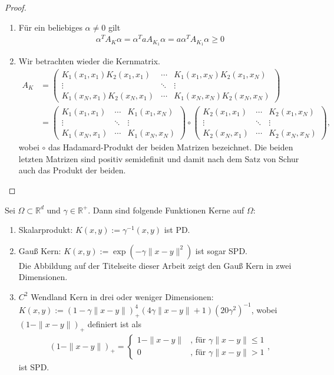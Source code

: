 \begin{proof}
\begin{enumerate}
\item
Für ein beliebiges $\alpha \neq 0$ gilt
\begin{align*}
\alpha^T A_K \alpha = \alpha^T a A_{K_1} \alpha = a \alpha^T A_{K_1} \alpha \geq 0
\end{align*}
\item
Wir betrachten wieder die Kernmatrix.
\begin{align*}
A_K &= 
\begin{pmatrix}
K_1(x_1,x_1)K_2(x_1, x_1) & \cdots & K_1(x_1,x_N)K_2(x_1, x_N) \\ 
\vdots & \ddots & \vdots \\ 
K_1(x_N,x_1)K_2(x_N, x_1) & \cdots & K_1(x_N,x_N)K_2(x_N, x_N)
\end{pmatrix} \\
&= 
\begin{pmatrix}
K_1(x_1,x_1) & \cdots & K_1(x_1,x_N) \\ 
\vdots & \ddots & \vdots \\ 
K_1(x_N,x_1) & \cdots & K_1(x_N,x_N)
\end{pmatrix}
\circ
\begin{pmatrix}
K_2(x_1, x_1) & \cdots & K_2(x_1, x_N) \\ 
\vdots & \ddots & \vdots \\ 
K_2(x_N, x_1) & \cdots & K_2(x_N, x_N)
\end{pmatrix},
\end{align*}
wobei $\circ$ das Hadamard-Produkt der beiden Matrizen bezeichnet. 
Die beiden letzten Matrizen sind positiv semidefinit und damit nach dem Satz von Schur \cite[Theorem 7.5.3]{Horn.2013} auch das Produkt der beiden.
\end{enumerate}
\end{proof}

\begin{example}
\label{ex:Kern}
Sei $\Omega \subset \mathbb{R}^d$ und $\gamma \in \mathbb{R}^+$. Dann sind folgende Funktionen Kerne auf $\Omega$:
\begin{enumerate}
\item Skalarprodukt: $K(x,y) := \gamma^{-1} (x,y)$ ist \ac{PD}.
\item Gauß Kern: $K(x,y) := \exp\left(-\gamma \|x-y\|^2\right)$ ist sogar \ac{SPD}.\\
Die Abbildung auf der Titelseite dieser Arbeit zeigt den Gauß Kern in zwei Dimensionen.
\item $C^2$ Wendland Kern in drei oder weniger Dimensionen: \\$K(x,y) := (1- \gamma \|x-y\|)_+^4(4 \gamma \|x-y\| +1) (20 \gamma^2)^{-1}$, wobei $(1-\|x-y\|)_+$ definiert ist als
\begin{align*}
(1 - \|x-y\|)_+ =
\begin{cases}
1 - \|x-y\| & \text{, für } \gamma \|x-y\| \leq 1 \\
0 & \text{, für } \gamma \|x-y\| > 1
\end{cases},
\end{align*}
ist \ac{SPD}.
\end{enumerate}
\end{example}

